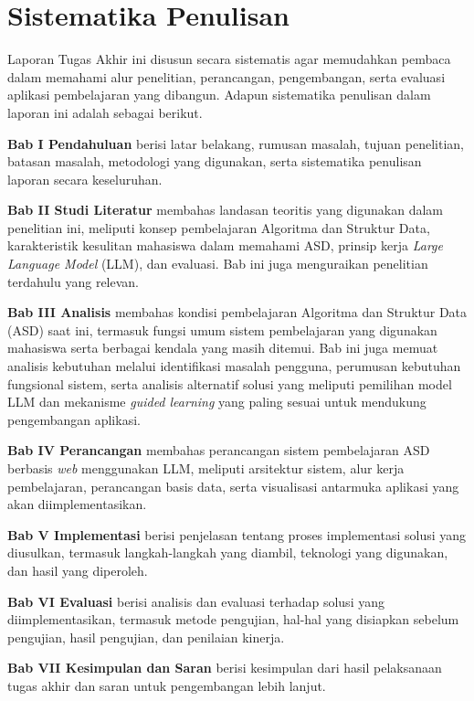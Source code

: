 \section{Sistematika Penulisan}
Laporan Tugas Akhir ini disusun secara sistematis agar memudahkan pembaca dalam memahami alur penelitian, perancangan, pengembangan, serta evaluasi aplikasi pembelajaran yang dibangun. Adapun sistematika penulisan dalam laporan ini adalah sebagai berikut.

\textbf{Bab I Pendahuluan} berisi latar belakang, rumusan masalah, tujuan penelitian, batasan masalah, metodologi yang digunakan, serta sistematika penulisan laporan secara keseluruhan.

\textbf{Bab II Studi Literatur} membahas landasan teoritis yang digunakan dalam penelitian ini, meliputi konsep pembelajaran Algoritma dan Struktur Data, karakteristik kesulitan mahasiswa dalam memahami ASD, prinsip kerja \textit{Large Language Model} (LLM), dan evaluasi. Bab ini juga menguraikan penelitian terdahulu yang relevan.

\textbf{Bab III Analisis} membahas kondisi pembelajaran Algoritma dan Struktur Data (ASD) saat ini, termasuk fungsi umum sistem pembelajaran yang digunakan mahasiswa serta berbagai kendala yang masih ditemui. Bab ini juga memuat analisis kebutuhan melalui identifikasi masalah pengguna, perumusan kebutuhan fungsional sistem, serta analisis alternatif solusi yang meliputi pemilihan model LLM dan mekanisme \textit{guided learning} yang paling sesuai untuk mendukung pengembangan aplikasi.

\textbf{Bab IV Perancangan} membahas perancangan sistem pembelajaran ASD berbasis \textit{web} menggunakan LLM, meliputi arsitektur sistem, alur kerja pembelajaran, perancangan basis data, serta visualisasi antarmuka aplikasi yang akan diimplementasikan.

\textbf{Bab V Implementasi} berisi penjelasan tentang proses implementasi solusi yang diusulkan, termasuk langkah-langkah yang diambil, teknologi yang digunakan, dan hasil yang diperoleh.

\textbf{Bab VI Evaluasi} berisi analisis dan evaluasi terhadap solusi yang diimplementasikan, termasuk metode pengujian, hal-hal yang disiapkan sebelum pengujian, hasil pengujian, dan penilaian kinerja.

\textbf{Bab VII Kesimpulan dan Saran} berisi kesimpulan dari hasil pelaksanaan tugas akhir dan saran untuk pengembangan lebih lanjut.
